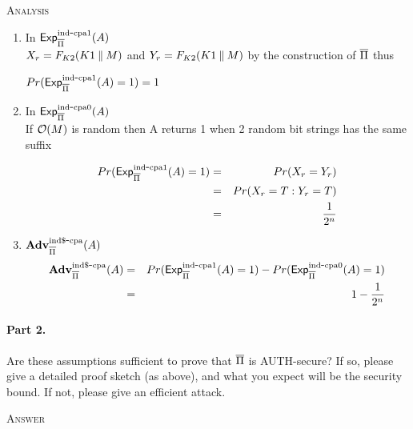 \documentclass[11pt]{article}
\begin{document}
\textsc{Analysis}\\
\begin{enumerate}
\item In $\mathsf{Exp}^{\mathrm{ind}\mbox{-}\mathrm{cpa1}}_{\overline{\Pi}}{(A)}$\\
$X_r = F_{K2}(K1 \:\|\: M)$ and $Y_r = F_{K2}(K1 \:\|\: M)$ by the construction of $\overline{\Pi}$ thus\\
\begin{center}
 $Pr(\mathsf{Exp}^{\mathrm{ind}\mbox{-}\mathrm{cpa1}}_{\overline{\Pi}}{(A)}=1) =1$
\end{center}

\item In $\mathsf{Exp}^{\mathrm{ind}\mbox{-}\mathrm{cpa0}}_{\overline{\Pi}}{(A)}$\\
If ${\cal O} (M)$ is random then A returns 1 when 2 random bit strings has the same suffix 

\begin{eqnarray*}
Pr(\mathsf{Exp}^{\mathrm{ind}\mbox{-}\mathrm{cpa1}}_{\overline{\Pi}}{(A)}=1) &=& Pr (X_r = Y_r)\\
&=& Pr (X_r = T: Y_r = T)\\
&=& \frac{1}{2^n}
\end{eqnarray*}

\item ${\mathbf{\bf Adv}}^{\mathrm{ind\$}\mbox{-}\mathrm{cpa}}_{\overline{\Pi}}(A)$\\

\begin{eqnarray*}
{\mathbf{\bf Adv}}^{\mathrm{ind\$}\mbox{-}\mathrm{cpa}}_{\overline{\Pi}}(A) &=& Pr(\mathsf{Exp}^{\mathrm{ind}\mbox{-}\mathrm{cpa1}}_{\overline{\Pi}}{(A)}=1)-Pr(\mathsf{Exp}^{\mathrm{ind}\mbox{-}\mathrm{cpa0}}_{\overline{\Pi}}{(A)}=1)\\
&=& 1 - \frac{1}{2^n}
\end{eqnarray*}

\end{enumerate}

\paragraph{Part 2.} Are these assumptions sufficient to prove that $\overline{\Pi}$ is AUTH-secure?
If so, please give a detailed proof sketch (as above), and what you
expect will be the security bound.  If not, please give an efficient attack.

\textsc{Answer}\\
\end{document}
